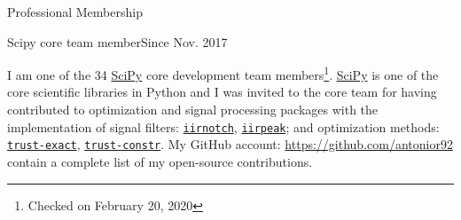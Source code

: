 \documentclass{resume} %
\begin{document}





\begin{rSection}{Professional Membership}


\begin{rSubsection}{Scipy core team member}{Since Nov. 2017}{}{}
  \item I am one of the 34 \href{https://www.scipy.org}{SciPy} core development  team members\footnote{Checked on February 20, 2020}.
  \href{https://www.scipy.org}{SciPy} is one of the core scientific libraries in Python and I was invited to the core team for having contributed to optimization and signal processing packages with the implementation of signal filters: \href{http://scipy.github.io/devdocs/generated/scipy.signal.iirnotch.html}{\texttt{iirnotch}}, \href{http://scipy.github.io/devdocs/generated/scipy.signal.iirpeak.html}{\texttt{iirpeak}}; and optimization methods: \href{http://scipy.github.io/devdocs/optimize.minimize-trustexact.html}{\texttt{trust-exact}}, \href{http://scipy.github.io/devdocs/optimize.minimize-trustconstr.html}{\texttt{trust-constr}}. My GitHub account: \href{https://github.com/antonior92}{https://github.com/antonior92} contain a complete list of my open-source contributions.
\end{rSubsection}
\end{rSection}
\end{document}

